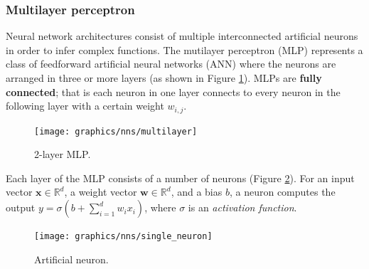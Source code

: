  	\subsubsection{Multilayer perceptron}  \label{Section 2.2.2.2}
	Neural network architectures consist of multiple interconnected artificial neurons in order to infer complex functions. The mutilayer perceptron (MLP) represents a class of feedforward artificial neural networks (ANN) where the neurons are arranged in three or more layers (as shown in Figure \ref{Fig: prep/ml/mlp/mlp}). MLPs are \textbf{fully connected}; that is each neuron in one layer connects to every neuron in the following layer with a certain weight $w_{i, j}$.

	\begin{figure}[H]
		\centering
		\texttt{[image: graphics/nns/multilayer]}
		\caption[Multilayer perceptron]{
			2-layer MLP.
		}
		\label{Fig: prep/ml/mlp/mlp}	
	\end{figure}	

	 Each layer of the MLP consists of a number of neurons (Figure \ref{Fig: prep/ml/mlp/neuron}). For an input vector $\mathbf{x}\in\mathbb{R}^d$, a weight vector $\mathbf{w}\in\mathbb{R}^d$, and a bias $b$, a neuron computes the output $y = \sigma(b + \sum_{i=1}^{d} w_i x_i)$, where $\sigma$ is an \textit{activation function}.
	
	\begin{figure}[H]
		\centering
		
		\texttt{[image: graphics/nns/single\_neuron]}
		\caption[\textbf{Artificial neuron}]{
			Artificial neuron. 
		}
		\label{Fig: prep/ml/mlp/neuron}
	\end{figure}
